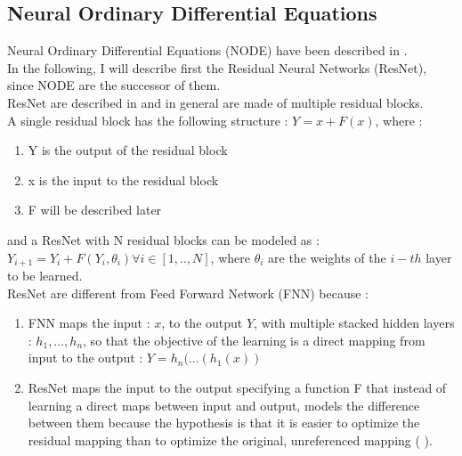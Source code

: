 \documentclass[LaM,binding=0.6cm]{sapthesis}
\begin{document}
\subsection{Neural Ordinary Differential Equations}
Neural Ordinary Differential Equations (NODE) have been described in \cite{2}.\\In the following, I will describe first the Residual Neural Networks (ResNet), since NODE are the successor of them.\\ResNet are described in \cite{6} and in general are made of multiple residual blocks.\\A single residual block has the following structure : $Y = x +F(x)$, where :
\begin{enumerate}
\item Y is the output of the residual block
\item x is the input to the residual block
\item F will be described later
\end{enumerate}
and a ResNet with N residual blocks can be modeled as : $Y_{i+1} = Y_{i} +F(Y_{i},\theta_{i}) \forall i \in [1,..,N]$, where $\theta_{i}$ are the weights of the $i-th$ layer to be learned.\\ResNet are different from Feed Forward Network (FNN) because :
\begin{enumerate}
\item FNN maps the input : $x$, to the output $Y$, with multiple stacked hidden layers : $h_1, \dots, h_n$, so that the objective of the learning is a direct mapping from input to the output : $Y=h_n(\dots (h_1(x))$
\item ResNet maps the input to the output specifying a function F that instead of learning a direct maps between input and output, models the difference between them because the hypothesis is that it is easier to optimize the residual mapping than to optimize the original, unreferenced mapping (\cite{6} ).
\end{enumerate}
\end{document}
